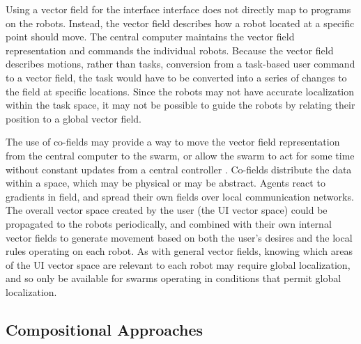 Using a vector field  for the interface interface does not directly map to programs on the robots. 
Instead, the vector field describes how a robot located at a specific point should move. 
The central computer maintains the vector field representation and commands the individual robots.
Because the vector field describes motions, rather than tasks, conversion from a task-based user command to a vector field, the task would have to be converted into a series of changes to the field at specific locations.
Since the robots may not have accurate localization within the task space, it may not be possible to guide the robots by relating their position to a global vector field. 

The use of co-fields may provide a way to move the vector field representation from the central computer to the swarm, or allow the swarm to act for some time without constant updates from a central controller \citep{mamei2003co}.
Co-fields distribute the data within a space, which may be physical or may be abstract. 
Agents react to gradients in field, and spread their own fields over local communication networks. 
The overall vector space created by the user (the UI vector space) could be propagated to the robots periodically, and combined with their own internal vector fields to generate movement based on both the user's desires and the local rules operating on each robot. 
As with general vector fields, knowing which areas of the UI vector space are relevant to each robot may require global localization, and so only be available for swarms operating in conditions that permit global localization. 

\subsection{Compositional Approaches} \label{section:Compositional_Approaches}

